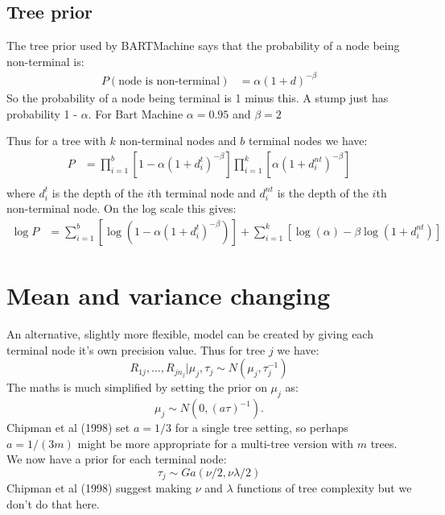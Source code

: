 \documentclass{article}
\begin{document}
\subsection*{Tree prior}

The tree prior used by BARTMachine says that the probability of a node being non-terminal is:
\begin{align*}
P(\mbox{node is non-terminal}) &= \alpha (1 + d)^{-\beta}
\end{align*}
So the probability of a node being terminal is 1 minus this. A stump just has probability 1 - $\alpha$. For Bart Machine $\alpha = 0.95$ and $\beta = 2$

Thus for a tree with $k$ non-terminal nodes and $b$ terminal nodes we have:
\begin{align*}
P &= \prod_{i=1}^b \left[ 1 - \alpha (1 + d^t_i)^{-\beta} \right] \prod_{i=1}^k \left[ \alpha (1 + d^{nt}_i)^{-\beta} \right] \\
\end{align*}
where $d^t_i$ is the depth of the $i$th terminal node and $d^{nt}_i$ is the depth of the $i$th non-terminal node.
On the log scale this gives:
\begin{align}
\log P &= \sum_{i=1}^b \left[ \log \left(1 - \alpha(1 + d^t_i)^{-\beta} \right) \right] + \sum_{i=1}^k \left[ \log(\alpha) - \beta \log(1 + d^{nt}_i) \right]
\end{align}

\section*{Mean and variance changing}

An alternative, slightly more flexible, model can be created by giving each terminal node it's own precision value. Thus for tree $j$ we have:
$$ R_{1j}, \ldots, R_{jn_j} | \mu_j, \tau_j \sim N(\mu_j, \tau_j^{-1})$$
The maths is much simplified by setting the prior on $\mu_j$ as:
$$\mu_j \sim N(0, (a \tau)^{-1}).$$
Chipman et al (1998) set $a = 1/3$ for a single tree setting, so perhaps $a = 1/(3m)$ might be more appropriate for a multi-tree version with $m$ trees.\\

We now have a prior for each terminal node:
$$\tau_j \sim Ga(\nu/2, \nu \lambda / 2)$$
Chipman et al (1998) suggest making $\nu$ and $\lambda$ functions of tree complexity but we don't do that here.\\
\end{document}

